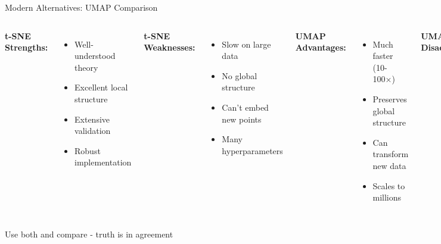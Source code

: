 \documentclass[aspectratio=169]{beamer}
\begin{document}
\begin{frame}{Modern Alternatives: UMAP Comparison}
\begin{columns}
\textbf{t-SNE Strengths:}
\begin{itemize}
\item Well-understood theory
\item Excellent local structure
\item Extensive validation
\item Robust implementation
\end{itemize}

\textbf{t-SNE Weaknesses:}
\begin{itemize}
\item Slow on large data
\item No global structure
\item Can't embed new points
\item Many hyperparameters
\end{itemize}

\textbf{UMAP Advantages:}
\begin{itemize}
\item Much faster (10-100×)
\item Preserves global structure
\item Can transform new data
\item Scales to millions
\end{itemize}

\textbf{UMAP Disadvantages:}
\begin{itemize}
\item Less theoretical foundation
\item More parameters to tune
\item Less stable
\item Newer, less tested
\end{itemize}
\end{columns}

\colorbox{yellow!30}{Use both and compare - truth is in agreement}
\end{frame}
\end{document}
